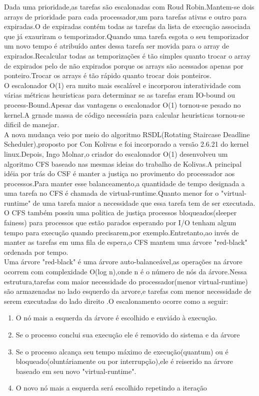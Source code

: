 \documentclass[conference]{IEEEtran}
\begin{document}
 Dada uma prioridade,as tarefas são escalonadas com Roud Robin.Mantem-se dois arrays de prioridade para cada processador,um para tarefas ativas e outro para expiradas.O de expiradas contém todas as tarefas da lista de execução associada que já exauriram o temporizador.Quando uma tarefa esgota o seu temporizador um novo tempo é atribuído antes dessa tarefa ser movida para o array de expirados.Recalcular todas as temporizações é tão simples quanto trocar o array de expirados pelo de não expirados porque os arrays são acessados apenas por ponteiro.Trocar os arrays é tão rápido quanto trocar dois ponteiros\cite{LinuxSchedulerMIT}.\\

 O escalonador O(1) era muito mais escalável e incorporou interatividade com várias métricas heuristicas para determinar se as tarefas eram IO-bound ou process-Bound.Apesar das vantagens o escalonador O(1) tornou-se pesado no kernel.A grnade massa de código necessária para calcular heuristicas tornou-se dificil de manejar.\\

 A nova mudança veio por meio do algoritmo RSDL(Rotating Staircase Deadline Scheduler),proposto por Con Kolivas e foi incorporado a versão 2.6.21 do kernel linux.Depois, Ingo Molnar,o criador do escalonador O(1) desenvolveu um algoritmo CFS baseado nas mesmas ideias do trabalho de Kolivas.A principal idéia por trás do CSF é manter a justiça no provimento do processador aos processos.Para manter esse balanceamento,a quantidade de tempo designada a uma tarefa no CFS é chamada de virtual-runtime.Quanto menor for o "virtual-runtime" de uma tarefa maior a necessidade que essa tarefa tem de ser executada.\\
 
O CFS também possiu uma politica de justiça processos bloqueados(sleeper fainess) para processos que estão parados esperando por I/O tenham algum tempo para execução quando precisarem,por exemplo.Entretanto,ao invés de manter as tarefas em uma fila de espera,o CFS mantem uma árvore "red-black" ordenada por tempo.\\

Uma árvore "red-black" é uma árvore 
auto-balanceável,as operações na árvore ocorrem com complexidade O(log n),onde n é o número de nós da árvore.Nessa estrutura,tarefas com maior necessidade do processador(menor virtual-runtime) são armazenadas no lado esquerdo da arvore,e tarefas com menor necessidade de serem executadas do lado direito \cite{LinuxSchedulerIBM}.O escalonamento ocorre como a seguir:
\begin{enumerate}
	\item O nó mais a esquerda da árvore é escolhido e enviádo à execução.
	\item Se o processo conclui sua execução ele é removido do sistema e da árvore
	\item Se o processo alcança seu tempo máximo de execução(quantum) ou é bloqueado(oluntáriamente ou por interrupção),ele é reiserido na árvore baseado em seu novo "virtual-runtime".
	\item O novo nó mais a esquerda será escolhido repetindo a iteração\cite{LinuxSchedulerWiki}
\end{enumerate}
\end{document}
